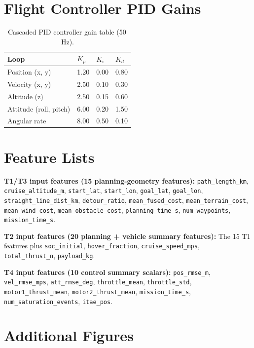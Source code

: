 \documentclass{article}
\theoremstyle{plain}
\theoremstyle{definition}
\begin{document}
\section{Flight Controller PID Gains}
\label{app:pid_gains}

\begin{table}[h]
\centering
\caption{Cascaded PID controller gain table (50\,Hz).}
\begin{tabular}{llll}
\toprule
Loop & $K_p$ & $K_i$ & $K_d$ \\
\midrule
Position (x, y)  & 1.20 & 0.00 & 0.80 \\
Velocity (x, y)  & 2.50 & 0.10 & 0.30 \\
Altitude (z)     & 2.50 & 0.15 & 0.60 \\
Attitude (roll, pitch) & 6.00 & 0.20 & 1.50 \\
Angular rate     & 8.00 & 0.50 & 0.10 \\
\bottomrule
\end{tabular}
\end{table}

\section{Feature Lists}
\label{app:features}

\textbf{T1/T3 input features (15 planning-geometry features):}
\texttt{path\_length\_km}, \texttt{cruise\_altitude\_m},
\texttt{start\_lat}, \texttt{start\_lon}, \texttt{goal\_lat}, \texttt{goal\_lon},
\texttt{straight\_line\_dist\_km}, \texttt{detour\_ratio},
\texttt{mean\_fused\_cost}, \texttt{mean\_terrain\_cost},
\texttt{mean\_wind\_cost}, \texttt{mean\_obstacle\_cost},
\texttt{planning\_time\_s}, \texttt{num\_waypoints}, \texttt{mission\_time\_s}.

\textbf{T2 input features (20 planning + vehicle summary features):}
The 15 T1 features plus \texttt{soc\_initial}, \texttt{hover\_fraction},
\texttt{cruise\_speed\_mps}, \texttt{total\_thrust\_n}, \texttt{payload\_kg}.

\textbf{T4 input features (10 control summary scalars):}
\texttt{pos\_rmse\_m}, \texttt{vel\_rmse\_mps}, \texttt{att\_rmse\_deg},
\texttt{throttle\_mean}, \texttt{throttle\_std},
\texttt{motor1\_thrust\_mean}, \texttt{motor2\_thrust\_mean},
\texttt{mission\_time\_s}, \texttt{num\_saturation\_events},
\texttt{itae\_pos}.

\section{Additional Figures}
\end{document}

